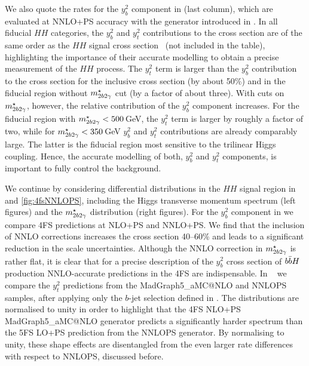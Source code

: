 \documentclass[11pt,a4paper]{article}
\begin{document}
We also quote the rates for the \bbH{} $y_b^2$ component in  (last column), which are evaluated at NNLO+PS 
accuracy with the \minnlo{} generator introduced in . 
In all fiducial $HH$ categories, the $y_b^2$ and $y_t^2$ contributions to the \bbH{} cross section are of the same order 
as the $HH$ signal cross section~\cite{manzoni:2023qaf} (not included in the table), highlighting the importance of their 
accurate modelling to obtain a precise measurement of the $HH$ process. 
The $y_t^2$ term is larger than the $y_b^2$ contribution to the \bbH{} cross section for the inclusive cross section (by about 50\%) 
and in the fiducial region without $m_{2b2\gamma}^{\star}$ cut (by a factor of about three). With cuts on $m_{2b2\gamma}^{\star}$, however, the relative contribution of the 
$y_b^2$ component increases. For the fiducial region with $m_{2b2\gamma}^{\star}<500$\,GeV, the $y_t^2$ term is larger by roughly a factor of 
two, while for $m_{2b2\gamma}^{\star}<350$\,GeV $y_b^2$ and $y_t^2$ contributions are already comparably large. 
The latter is the fiducial region most sensitive to the trilinear Higgs coupling. Hence, the accurate modelling 
of both, $y_b^2$ and $y_t^2$ components, is important to fully control the \bbH{} background.

We continue by considering differential distributions in the $HH$ signal region in  and \ref{fig:4fsNNLOPS}, including 
the Higgs transverse momentum spectrum (left figures) and the $m_{2b2\gamma}^{\star}$ distribution (right figures).
For the $y_b^2$ component in  we compare 4FS predictions at NLO+PS and NNLO+PS. We find that the inclusion 
of NNLO corrections increases the cross section 40--60\% 
and leads to a significant reduction in the scale uncertainties. Although the NNLO correction in $m_{2b2\gamma}^{\star}$ is rather flat,
it is clear that for a precise description of the $y_b^2$ cross section of $b\bar{b}H{}$ production 
NNLO-accurate predictions in the 4FS are indispensable.
In ~\cite{atlaspub} we compare the $y_t^2$ predictions from the {\sc MadGraph5\_aMC@NLO} and {\sc NNLOPS} samples, 
after applying only the $b$-jet selection defined in . 
The distributions are normalised to unity in order to highlight that the 4FS NLO+PS {\sc MadGraph5\_aMC@NLO} generator
predicts a significantly harder spectrum than the 5FS LO+PS prediction from the  {\sc NNLOPS} generator.
By normalising to unity, these shape effects are disentangled from the even larger rate differences with respect to {\sc NNLOPS}, discussed before.
\end{document}
